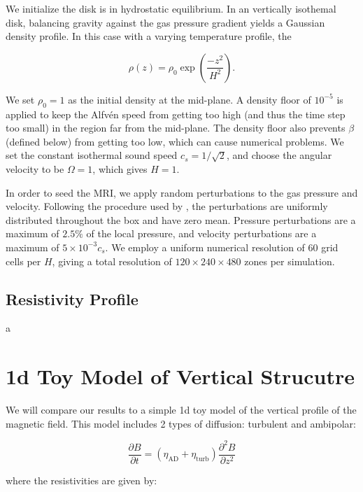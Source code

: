 We initialize the disk is in hydrostatic equilibrium.  In an vertically isothemal disk, balancing gravity against the gas pressure gradient yields a Gaussian density profile.  In this case with a varying temperature profile, the 

\begin{equation}
\rho(z) = \rho_0 \exp\left(\frac{-z^2}{H^2}\right).                  
\end{equation}

\noindent We set $\rho_0 = 1$ as the initial density at the mid-plane.  A density floor of $10^{-5}$ is applied to keep the Alfv\'en speed from getting too high (and thus the time step too small) in the region far from the mid-plane.  The density floor also prevents $\beta$ (defined below) from getting too low, which can cause numerical problems. We set 
the constant isothermal sound speed $c_s=1/\sqrt{2}$, and choose the angular velocity to be $\Omega = 1$, which gives $H = 1$.

 
In order to seed the MRI, we apply random perturbations to the gas pressure and velocity. Following the procedure used by \cite{hawley95}, the perturbations are uniformly distributed throughout the box and have zero mean.  Pressure perturbations are a maximum of $2.5 \%$ of the local pressure, and velocity perturbations are a maximum of $5\times 10^{-3}c_s$. We employ a uniform numerical resolution of 60 grid cells per $H$, giving a total resolution of $120\times240\times480$ zones per simulation.  


\subsection{Resistivity Profile}
a




\newpage
\section{1d Toy Model of  Vertical Strucutre}
We will compare our results to a simple 1d toy model of the vertical profile of the magnetic field.  This model includes 2 types of diffusion: turbulent and ambipolar: 

\begin{equation}
\frac{\partial B}{\partial t} = (\eta_{\text{AD}} + \eta_{\text{turb}}) \frac{\partial^2 B}{\partial z^2}                   
\end{equation}

\noindent where the resistivities are given by:

